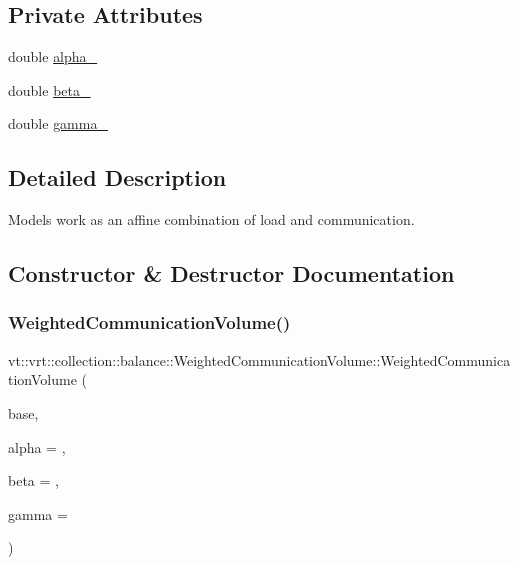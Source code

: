 \subsection*{Private Attributes}
\begin{DoxyCompactItemize}
\item 
double \hyperlink{classvt_1_1vrt_1_1collection_1_1balance_1_1_weighted_communication_volume_aaa23c5cee4ca724183ddd79b52c3e77a}{alpha\+\_\+}
\item 
double \hyperlink{classvt_1_1vrt_1_1collection_1_1balance_1_1_weighted_communication_volume_a292ab215ce7bced8fa55e8ecb8ab6c85}{beta\+\_\+}
\item 
double \hyperlink{classvt_1_1vrt_1_1collection_1_1balance_1_1_weighted_communication_volume_abf2c523db00b66871e4583c48d472f40}{gamma\+\_\+}
\end{DoxyCompactItemize}


\subsection{Detailed Description}
Models work as an affine combination of load and communication. 

\subsection{Constructor \& Destructor Documentation}
\mbox{\label{classvt_1_1vrt_1_1collection_1_1balance_1_1_weighted_communication_volume_a168729402b8779925cdfcbc8e67b15bb}} 
\subsubsection{\texorpdfstring{Weighted\+Communication\+Volume()}{WeightedCommunicationVolume()}}
{\footnotesize\ttfamily vt\+::vrt\+::collection\+::balance\+::\+Weighted\+Communication\+Volume\+::\+Weighted\+Communication\+Volume (\begin{DoxyParamCaption}\item[{std\+::shared\+\_\+ptr$<$ \hyperlink{structvt_1_1vrt_1_1collection_1_1balance_1_1_load_model}{Load\+Model} $>$}]{base,  }\item[{double}]{alpha = {},  }\item[{double}]{beta = {},  }\item[{double}]{gamma = {} }\end{DoxyParamCaption})\hspace{0.3cm}{\ttfamily [inline]}}


